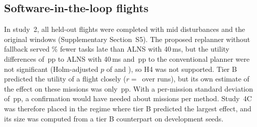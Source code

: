 \subsection{Software-in-the-loop flights}\label{sec:s2-tierc}
In study~2, all  held-out flights were completed with mid disturbances and the original windows
(Supplementary Section~S5). The proposed replanner without fallback served \% fewer tasks late than
ALNS with 40\,ms, but the utility differences of \,pp to ALNS with 40\,ms and \,pp to the
conventional planner were not significant (Holm-adjusted $p$ of  and ), so H4 was not
supported. Tier B predicted the utility of a flight closely ($r=$\, over  runs), but its own estimate
of the effect on these missions was only \,pp. With a per-mission standard deviation of
\,pp, a confirmation would have needed about  missions per method. Study~4C was
therefore placed in the regime where tier B predicted the largest effect, and its size was computed from a tier B
counterpart on development seeds.

